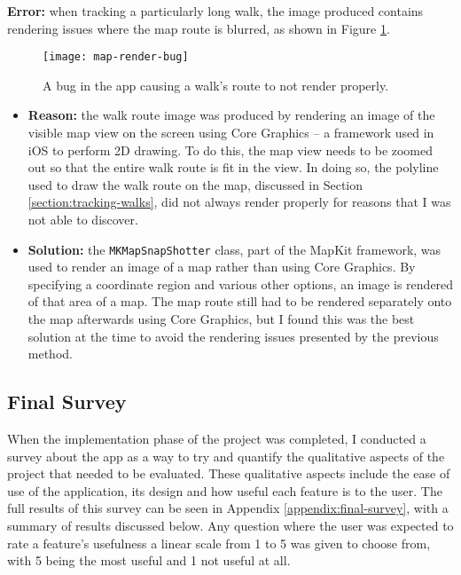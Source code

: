 \noindent \textbf{Error:} when tracking a particularly long walk, the image produced contains rendering issues where the map route is blurred, as shown in Figure \ref{fig:map-render-bug}.

\begin{figure}[hbt]
  \centering
  \texttt{[image: map-render-bug]}
  \caption{A bug in the app causing a walk's route to not render properly.}
  \label{fig:map-render-bug}
\end{figure}


\begin{itemize}
  \item \textbf{Reason:} the walk route image was produced by rendering an image of the visible map view on the screen using Core Graphics -- a framework used in iOS to perform 2D drawing. To do this, the map view needs to be zoomed out so that the entire walk route is fit in the view. In doing so, the polyline used to draw the walk route on the map, discussed in Section \ref{section:tracking-walks}, did not always render properly for reasons that I was not able to discover.
  
  \item \textbf{Solution:} the \verb|MKMapSnapShotter| class, part of the MapKit framework, was used to render an image of a map rather than using Core Graphics. By specifying a coordinate region and various other options, an image is rendered of that area of a map. The map route still had to be rendered separately onto the map afterwards using Core Graphics, but I found this was the best solution at the time to avoid the rendering issues presented by the previous method.
\end{itemize}

\subsection{Final Survey}


When the implementation phase of the project was completed, I conducted a survey about the app as a way to try and quantify the qualitative aspects of the project that needed to be evaluated. These qualitative aspects include the ease of use of the application, its design and how useful each feature is to the user. The full results of this survey can be seen in Appendix \ref{appendix:final-survey}, with a summary of results discussed below. Any question where the user was expected to rate a feature's usefulness a linear scale from 1 to 5 was given to choose from, with 5 being the most useful and 1 not useful at all.

